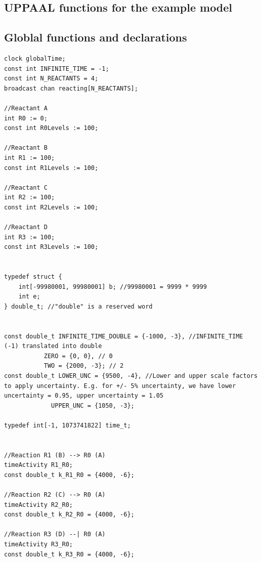 \documentclass{llncs}
\begin{document}

{\small}



\clearpage
\begin{subappendices}
\renewcommand{\thesection}{\Alph{section}}

 
\section{UPPAAL functions for the example model}\label{apx:double-functions}
\lstset{language=C,frame=none,tabsize=2,breaklines=true,numbers=none}

\addtolength{\oddsidemargin}{-2cm}
\addtolength{\evensidemargin}{-2cm}
\addtolength{\textwidth}{4cm}
\subsection{Globlal functions and declarations}
\begin{lstlisting}[linewidth=\textwidth]
clock globalTime;
const int INFINITE_TIME = -1;
const int N_REACTANTS = 4;
broadcast chan reacting[N_REACTANTS];

//Reactant A
int R0 := 0;
const int R0Levels := 100;

//Reactant B
int R1 := 100;
const int R1Levels := 100;

//Reactant C
int R2 := 100;
const int R2Levels := 100;

//Reactant D
int R3 := 100;
const int R3Levels := 100;


typedef struct {
	int[-99980001, 99980001] b; //99980001 = 9999 * 9999
	int e;
} double_t; //"double" is a reserved word


const double_t INFINITE_TIME_DOUBLE = {-1000, -3}, //INFINITE_TIME (-1) translated into double
	       ZERO = {0, 0}, // 0
	       TWO = {2000, -3}; // 2
const double_t LOWER_UNC = {9500, -4}, //Lower and upper scale factors to apply uncertainty. E.g. for +/- 5% uncertainty, we have lower uncertainty = 0.95, upper uncertainty = 1.05
             UPPER_UNC = {1050, -3};

typedef int[-1, 1073741822] time_t;


//Reaction R1 (B) --> R0 (A)
timeActivity R1_R0;
const double_t k_R1_R0 = {4000, -6};

//Reaction R2 (C) --> R0 (A)
timeActivity R2_R0;
const double_t k_R2_R0 = {4000, -6};

//Reaction R3 (D) --| R0 (A)
timeActivity R3_R0;
const double_t k_R3_R0 = {4000, -6};




\end{lstlisting}
\end{subappendices}
\end{document}

